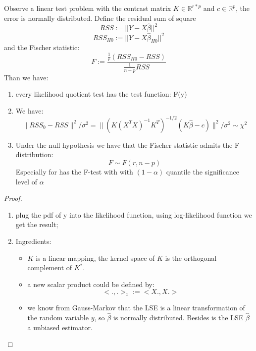 \begin{theorem}
Observe a linear test problem with the contrast matrix $K \in \mathbb{R}^{r * p}$ and $c \in \mathbb{R}^{p}$, the error is normally distributed. Define the residual sum of square
\begin{equation}
    RSS := ||Y - X\hat{\beta}||^2
\end{equation}
\begin{equation}
    RSS_{H0} := ||Y - X \hat{\beta}_{H0}||^2
\end{equation}
and the Fischer statistic:
\begin{equation}
    F:= \frac{\frac{1}{r}(RSS_{H0} - RSS)}{\frac{1}{n - p}RSS}
\end{equation}
Than we have:
\begin{enumerate}
    \item every likelihood quotient test has the test function: F(y)
    \item We have:
    \begin{equation}
        \| RSS_0 - RSS \|^2 / \sigma^2 = \| (K(X^T X)^{-1}K^T)^{-1/2} (K \hat{\beta} -c) \|^2/\sigma^2 \sim \chi^2
    \end{equation}
    \item Under the null hypothesis we have that the Fischer statistic admits the F distribution:
    \begin{equation}
        F \sim F(r, n - p)
    \end{equation}
    Especially for has the F-test with with $(1 - \alpha)$ quantile the significance level of $\alpha$ 
\end{enumerate}
\end{theorem}

\begin{proof}
\begin{enumerate}
    \item plug the pdf of y into the likelihood function, using log-likelihood function we get the result;
    \item Ingredients:
    \begin{itemize}
        \item $K$ is a linear mapping, the kernel space of $K$ is the orthogonal complement of  $K^*$.
        \item a new scalar product could be defined by:
        \begin{equation}
            <. , .>_x := <X., X.>
        \end{equation}
        \item we know from Gauss-Markov that the LSE is a linear transformation of the random variable $y$, so $\hat{\beta}$ is normally distributed. Besides is the LSE $\hat{\beta}$ a unbiased estimator.
    \end{itemize}
\end{enumerate}
\end{proof}





